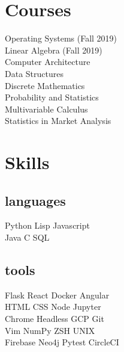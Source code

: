 \documentclass[]{houston-ethan-resume}
\begin{document}
\begin{minipage}[t]{0.33\textwidth}
	\sectionsep

%
%

\section{Courses}
Operating Systems (Fall 2019) \\
Linear Algebra (Fall 2019) \\
Computer Architecture \\
Data Structures \\
Discrete Mathematics \\
Probability and Statistics \\
Multivariable Calculus \\
Statistics in Market Analysis


%
%

\section{Skills}
\subsection{languages}
	Python \textbullet{}
	Lisp \textbullet{}
	Javascript \\
	Java \textbullet{}
	C \textbullet{}
	SQL
\sectionsep

\subsection{tools}
	Flask \textbullet{}
	React \textbullet{}
	Docker \textbullet{}
	Angular \\
	HTML \textbullet{}
	CSS \textbullet{}
	Node \textbullet{}
	Jupyter \\
	Chrome Headless \textbullet{}
	GCP \textbullet{}
	Git \\
	Vim \textbullet{}
	NumPy \textbullet{}
	ZSH \textbullet{}
	UNIX \\
	Firebase \textbullet{}
	Neo4j  \textbullet{}
	Pytest  \textbullet{}
	CircleCI

\sectionsep

%
%

\end{minipage}
\hfill
\end{document}
